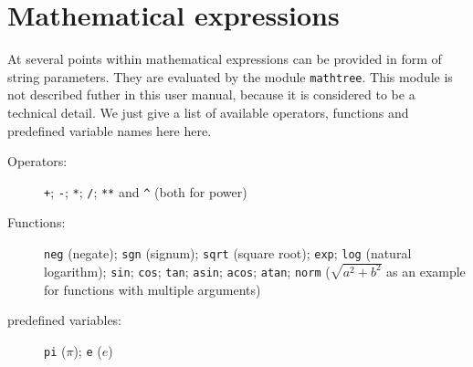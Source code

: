 \chapter{Mathematical expressions}
\label{mathtree}

At several points within \PyX{} mathematical expressions can be
provided in form of string parameters. They are evaluated by the
module \verb|mathtree|. This module is not described futher in this
user manual, because it is considered to be a technical detail. We
just give a list of available operators, functions and predefined
variable names here here.

\begin{description}
\item[Operators:]
\verb|+|; \verb|-|; \verb|*|; \verb|/|; \verb|**| and \verb|^| (both
for power)
\item[Functions:]
\verb|neg| (negate); \verb|sgn| (signum); \verb|sqrt| (square root);
\verb|exp|; \verb|log| (natural logarithm); \verb|sin|; \verb|cos|;
\verb|tan|; \verb|asin|; \verb|acos|; \verb|atan|; \verb|norm|
($\sqrt{a^2+b^2}$ as an example for functions with multiple arguments)
\item[predefined variables:]
\verb|pi| ($\pi$); \verb|e| ($e$)
\end{description}
